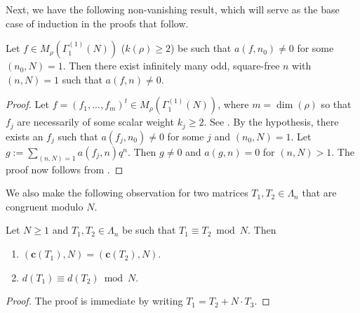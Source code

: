 \documentclass[11pt]{amsart}
\numberwithin{equation}{section}
\newcommand{\mf}{\mathbf}
\begin{document}


Next, we have the following non-vanishing result, which will serve as the base case of induction in the proofs that follow.
\begin{lemma}\label{ind-basecase}
    Let $f\in M_\rho(\Gamma_1^{(1)}(N))$ ($k(\rho) \ge 2$) be such that $a(f, n_0)\neq 0$ for some $(n_0,N)=1$. Then there exist infinitely many odd, square-free $n$ with $(n,N)=1$ such that $a(f, n)\neq 0$.
\end{lemma}
\begin{proof}
    Let $f=(f_1,...,f_m)^t \in M_\rho(\Gamma_1^{(1)}(N))$, where $m=\dim(\rho)$ so that $f_j$ are necessarily of some scalar weight $k_j \ge 2$. See \cite[Section~4.3]{boche-das}. By the hypothesis, there exists an $f_j$ such that $a(f_j, n_0)\neq 0$ for some $j$ and $(n_0, N)=1$. Let $g:=\sum_{(n,N)=1}a(f_j, n) q^n$. Then $g\neq 0$ and $a(g,n)=0$ for $(n, N)>1$. The proof now follows from \cite[Theorem 4.6]{boche-das}.
\end{proof}
We also make the following observation for two matrices $T_1, T_2\in \Lambda_n$ that are congruent modulo $N$.
\begin{lemma}\label{lem:detcong}
    Let $N\ge 1$ and $T_1, T_2\in \Lambda_n$ be such that $T_1\equiv T_2 \bmod N$. Then
    \begin{enumerate}
        \item $(\mf c(T_1), N)= (\mf c(T_2), N)$.
        \item $d(T_1)\equiv d(T_2) \bmod N$.
    \end{enumerate}
\end{lemma}
\begin{proof}
The proof is immediate by writing  $T_1= T_2+N\cdot T_3$.
\end{proof}

\end{document}

